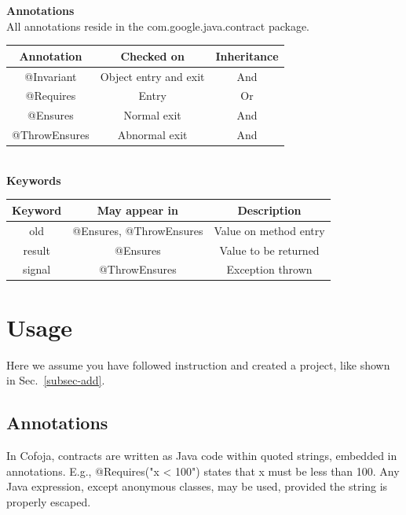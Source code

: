 \documentclass{article}
\begin{document}
\textbf{Annotations}\\

All annotations reside in the com.google.java.contract package.

\begin{tabular}{|c|c|c|}
\hline
Annotation&             Checked on&                     Inheritance\\
\hline
@Invariant&              Object entry and exit&       And\\
\hline
@Requires&              Entry&                                Or\\
\hline
@Ensures&               Normal exit&                      And\\
\hline
@ThrowEnsures&	Abnormal exit&                   And\\
\hline
\end{tabular}\\

\textbf{Keywords}\\

\begin{tabular}{|c|c|c|}
\hline
Keyword&                May appear in&                         Description\\
\hline
old&                        @Ensures, @ThrowEnsures&         Value on method entry\\
\hline
result&                    @Ensures&                              Value to be returned\\
\hline
signal&                   @ThrowEnsures&                    Exception thrown\\
\hline
\end{tabular}

 \section{Usage}

Here we assume you have followed instruction and created a project,
like shown in Sec.~\ref{subsec-add}.

\subsection{Annotations}

In Cofoja, contracts are written as Java code within quoted strings, embedded in annotations. E.g., @Requires("x < 100") states that x must be less than 100. Any Java expression, except anonymous classes, may be used, provided the string is properly escaped.
\end{document}
